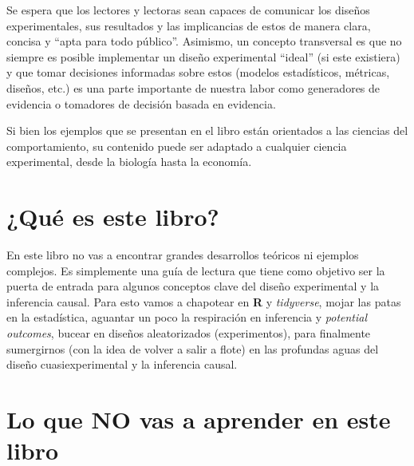 \documentclass[
  letterpaper,
  DIV=11,
  numbers=noendperiod,
  oneside]{scrreprt}
\begin{document}
Se espera que los lectores y lectoras sean capaces de comunicar los
diseños experimentales, sus resultados y las implicancias de estos de
manera clara, concisa y ``apta para todo público''. Asimismo, un
concepto transversal es que no siempre es posible implementar un diseño
experimental ``ideal'' (si este existiera) y que tomar decisiones
informadas sobre estos (modelos estadísticos, métricas, diseños, etc.)
es una parte importante de nuestra labor como generadores de evidencia o
tomadores de decisión basada en evidencia.

\begin{tcolorbox}[enhanced jigsaw, breakable, rightrule=.15mm, colbacktitle=quarto-callout-tip-color!10!white, bottomtitle=1mm, arc=.35mm, titlerule=0mm, left=2mm, toprule=.15mm, leftrule=.75mm, colback=white, opacitybacktitle=0.6, opacityback=0, colframe=quarto-callout-tip-color-frame, bottomrule=.15mm, coltitle=black, toptitle=1mm, title={SIGA SIGA\ldots{}}]
Si bien los ejemplos que se presentan en el libro están orientados a las
ciencias del comportamiento, su contenido puede ser adaptado a cualquier
ciencia experimental, desde la biología hasta la economía.
\end{tcolorbox}

\hypertarget{quuxe9-es-este-libro}{%
\section*{¿Qué es este libro?}\label{quuxe9-es-este-libro}}

En este libro no vas a encontrar grandes desarrollos teóricos ni
ejemplos complejos. Es simplemente una guía de lectura que tiene como
objetivo ser la puerta de entrada para algunos conceptos clave del
diseño experimental y la inferencia causal. Para esto vamos a chapotear
en \textbf{R} y \emph{tidyverse}, mojar las patas en la estadística,
aguantar un poco la respiración en inferencia y \emph{potential
outcomes}, bucear en diseños aleatorizados (experimentos), para
finalmente sumergirnos (con la idea de volver a salir a flote) en las
profundas aguas del diseño cuasiexperimental y la inferencia causal.

\hypertarget{lo-que-no-vas-a-aprender-en-este-libro}{%
\section*{Lo que NO vas a aprender en este
libro}\label{lo-que-no-vas-a-aprender-en-este-libro}}
\end{document}
